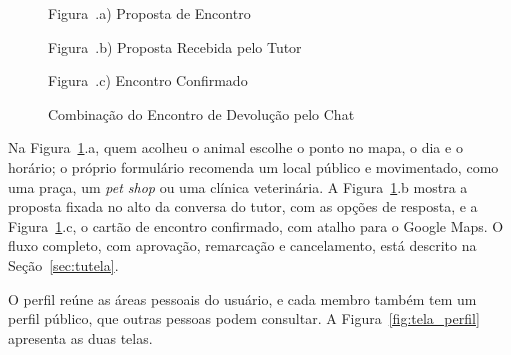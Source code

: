 \begin{figure}[H]
    \centering
    \caption{Combinação do Encontro de Devolução pelo Chat}
    \label{fig:tela_encontro_devolucao}
    \vspace{0.15cm}
    \begin{minipage}[t]{0.31\textwidth}
        \centering
        \par\vspace{0.12cm}
        {\small Figura~\thefigure.a) Proposta de Encontro}
    \end{minipage}
    \hfill
    \begin{minipage}[t]{0.31\textwidth}
        \centering
        \par\vspace{0.12cm}
        {\small Figura~\thefigure.b) Proposta Recebida pelo Tutor}
    \end{minipage}
    \hfill
    \begin{minipage}[t]{0.31\textwidth}
        \centering
        \par\vspace{0.12cm}
        {\small Figura~\thefigure.c) Encontro Confirmado}
    \end{minipage}
    \par\vspace{0.12cm}
\end{figure}

Na Figura~\ref{fig:tela_encontro_devolucao}.a, quem acolheu o animal escolhe o ponto no mapa, o dia e o horário; o próprio formulário recomenda um local público e movimentado, como uma praça, um \textit{pet shop} ou uma clínica veterinária. A Figura~\ref{fig:tela_encontro_devolucao}.b mostra a proposta fixada no alto da conversa do tutor, com as opções de resposta, e a Figura~\ref{fig:tela_encontro_devolucao}.c, o cartão de encontro confirmado, com atalho para o Google Maps. O fluxo completo, com aprovação, remarcação e cancelamento, está descrito na Seção~\ref{sec:tutela}.

O perfil reúne as áreas pessoais do usuário, e cada membro também tem um perfil público, que outras pessoas podem consultar. A Figura~\ref{fig:tela_perfil} apresenta as duas telas.

